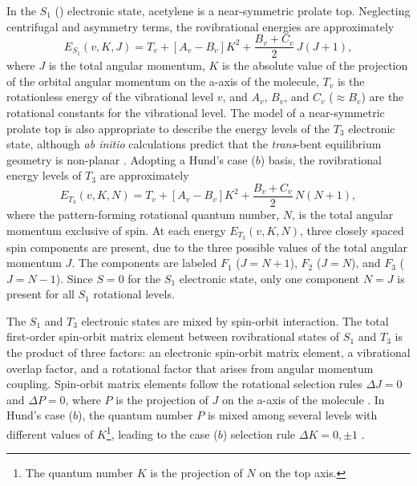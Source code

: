 In the $S_1$ (\astate) electronic state, acetylene is a near-symmetric
prolate top.  Neglecting centrifugal and asymmetry terms, the
rovibrational energies are approximately \cite{watson82}
\begin{equation}
  \label{eq:s1-energy-levels}
  E_{S_1}(v,K,J) = T_v + [A_v - B_v] K^2 + \frac{B_v+C_v}{2} \, J(J+1),
\end{equation}
where $J$ is the total angular momentum, $K$ is the absolute value of
the projection of the orbital angular momentum on the a-axis of the
molecule, $T_v$ is the rotationless energy of the vibrational level
$v$, and $A_v$, $B_v$, and $C_v$ ($\approx B_v$) are the rotational
constants for the vibrational level.  The model of a near-symmetric
prolate top is also appropriate to describe the energy levels of the
$T_3$ electronic state, although \emph{ab initio} calculations predict
that the \emph{trans}-bent equilibrium geometry is non-planar
\cite{ventura03, thom07}.  Adopting a Hund's case ($b$) basis, the
rovibrational energy levels of $T_3$ are approximately
\begin{equation}
  \label{eq:t3-energy-levels}
  E_{T_3}(v,K,N) = T_v + [A_v - B_v] K^2 + \frac{B_v+C_v}{2} \, N(N+1),
\end{equation}
where the pattern-forming rotational quantum number, $N$, is the total
angular momentum exclusive of spin.  At each energy $E_{T_3}(v,K,N)$,
three closely spaced spin components are present, due to the three
possible values of the total angular momentum $J$.  The components are
labeled $F_1$ ($J=N+1$), $F_2$ ($J=N$), and $F_3$ ($J=N-1$).  
Since $S=0$ for the $S_1$ electronic state,
only one component $N=J$ is present for all $S_1$ rotational levels.



The $S_1$ and $T_3$ electronic states are mixed by spin-orbit
interaction.  The total first-order spin-orbit matrix element between
rovibrational states of $S_1$ and $T_3$ is the product of three
factors: an electronic spin-orbit matrix element, a vibrational
overlap factor, and a rotational factor that arises from angular
momentum coupling.  Spin-orbit matrix elements follow the rotational
selection rules $\Delta J = 0$ and $\Delta P = 0$, where $P$ is the
projection of $J$ on the a-axis of the molecule \cite{hougen64}.  In
Hund's case ($b$), the quantum number $P$ is mixed among several
levels with different values of $K$\footnote{The quantum number $K$ is
  the projection of $N$ on the top axis.}, leading to the case ($b$)
selection rule $\Delta K = 0, \pm 1$ \cite{hougen64, stevens73}.

